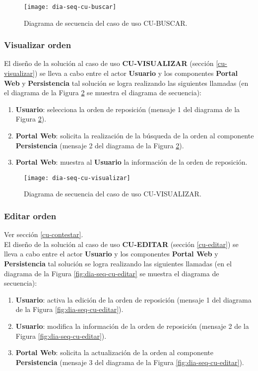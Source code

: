 \begin{figure}[h]
	\centering
	\texttt{[image: dia-seq-cu-buscar]}
	\caption{Diagrama de secuencia del caso de uso CU-BUSCAR.}
	\label{fig:dia-seq-cu-buscar}
\end{figure}

\subsubsection{Visualizar orden}
El diseño de la solución al caso de uso \textbf{CU-VISUALIZAR} (sección \ref{cu-visualizar}) se lleva a cabo entre el actor \textbf{Usuario} y los componentes \textbf{Portal Web} y \textbf{Persistencia} tal solución se logra realizando las siguientes llamadas (en el diagrama de la Figura \ref{fig:dia-seq-cu-visualizar} se muestra el diagrama de secuencia):
\begin{enumerate}
	\item \textbf{Usuario}: selecciona la orden de reposición (mensaje 1 del diagrama de la Figura \ref{fig:dia-seq-cu-visualizar}).
	\item \textbf{Portal Web}: solicita la realización de la búsqueda de la orden al componente \textbf{Persistencia} (mensaje 2 del diagrama de la Figura \ref{fig:dia-seq-cu-visualizar}).
	\item \textbf{Portal Web}: muestra al \textbf{Usuario} la información de la orden de reposición.
\end{enumerate}

\begin{figure}[h]
	\centering
	\texttt{[image: dia-seq-cu-visualizar]}
	\caption{Diagrama de secuencia del caso de uso CU-VISUALIZAR.}
	\label{fig:dia-seq-cu-visualizar}
\end{figure}

\subsubsection{Editar orden}
Ver sección \ref{cu-contestar}.\\
El diseño de la solución al caso de uso \textbf{CU-EDITAR} (sección \ref{cu-editar}) se lleva a cabo entre el actor \textbf{Usuario} y los componentes \textbf{Portal Web} y \textbf{Persistencia} tal solución se logra realizando las siguientes llamadas (en el diagrama de la Figura \ref{fig:dia-seq-cu-editar} se muestra el diagrama de secuencia):
\begin{enumerate}
	\item \textbf{Usuario}: activa la edición de la orden de reposición (mensaje 1 del diagrama de la Figura \ref{fig:dia-seq-cu-editar}).
	\item \textbf{Usuario}: modifica la información de la orden de reposición (mensaje 2 de la Figura \ref{fig:dia-seq-cu-editar}).
	\item \textbf{Portal Web}: solicita la actualización de la orden al componente \textbf{Persistencia} (mensaje 3 del diagrama de la Figura \ref{fig:dia-seq-cu-editar}).
\end{enumerate}

